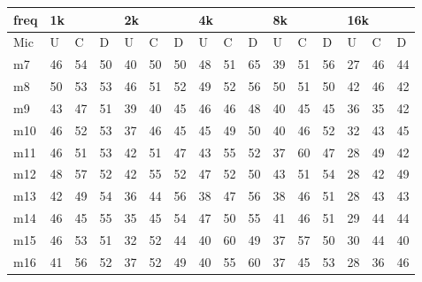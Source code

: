\begin{table}[]
\begin{tabular}{l|l|l|l|l|l|l|l|l|l|l|l|l|lll}
freq & \multicolumn{3}{l|}{1k} & \multicolumn{3}{l|}{2k} & \multicolumn{3}{l|}{4k} & \multicolumn{3}{l|}{8k} & \multicolumn{3}{l}{16k}                                \\ \hline
Mic  & U      & C      & D     & U      & C      & D     & U      & C      & D     & U      & C      & D     & \multicolumn{1}{l|}{U}  & \multicolumn{1}{l|}{C}  & D  \\ \hline
m7   & 46     & 54     & 50    & 40     & 50     & 50    & 48     & 51     & 65    & 39     & 51     & 56    & \multicolumn{1}{l|}{27} & \multicolumn{1}{l|}{46} & 44 \\
m8   & 50     & 53     & 53    & 46     & 51     & 52    & 49     & 52     & 56    & 50     & 51     & 50    & \multicolumn{1}{l|}{42} & \multicolumn{1}{l|}{46} & 42 \\
m9   & 43     & 47     & 51    & 39     & 40     & 45    & 46     & 46     & 48    & 40     & 45     & 45    & \multicolumn{1}{l|}{36} & \multicolumn{1}{l|}{35} & 42 \\
m10  & 46     & 52     & 53    & 37     & 46     & 45    & 45     & 49     & 50    & 40     & 46     & 52    & \multicolumn{1}{l|}{32} & \multicolumn{1}{l|}{43} & 45 \\
m11  & 46     & 51     & 53    & 42     & 51     & 47    & 43     & 55     & 52    & 37     & 60     & 47    & \multicolumn{1}{l|}{28} & \multicolumn{1}{l|}{49} & 42 \\
m12  & 48     & 57     & 52    & 42     & 55     & 52    & 47     & 52     & 50    & 43     & 51     & 54    & \multicolumn{1}{l|}{28} & \multicolumn{1}{l|}{42} & 49 \\
m13  & 42     & 49     & 54    & 36     & 44     & 56    & 38     & 47     & 56    & 38     & 46     & 51    & \multicolumn{1}{l|}{28} & \multicolumn{1}{l|}{43} & 43 \\
m14  & 46     & 45     & 55    & 35     & 45     & 54    & 47     & 50     & 55    & 41     & 46     & 51    & \multicolumn{1}{l|}{29} & \multicolumn{1}{l|}{44} & 44 \\
m15  & 46     & 53     & 51    & 32     & 52     & 44    & 40     & 60     & 49    & 37     & 57     & 50    & \multicolumn{1}{l|}{30} & \multicolumn{1}{l|}{44} & 40 \\
m16  & 41     & 56     & 52    & 37     & 52     & 49    & 40     & 55     & 60    & 37     & 45     & 53    & \multicolumn{1}{l|}{28} & \multicolumn{1}{l|}{36} & 46 \\

\end{tabular}
\end{table}
